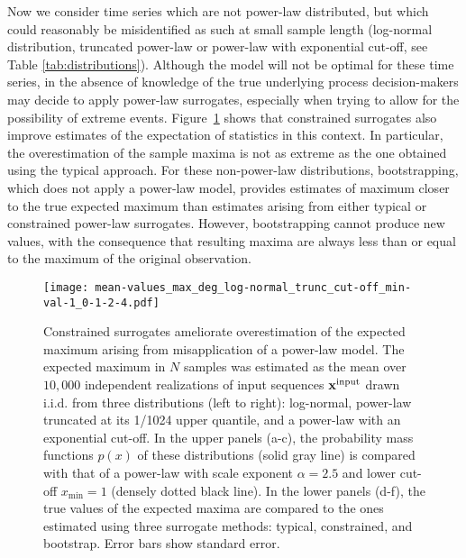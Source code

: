\documentclass[%
prx,
reprint,
superscriptaddress,
nofootinbib,
 amsmath,amssymb,
 aps,
floatfix,
]{revtex4-2}
\newcommand{\xin}{{{\bf x}^{\text{input}}}}
\begin{document}
Now we consider time series which are not power-law distributed, but which could reasonably be misidentified as such at small sample length (log-normal distribution, truncated power-law or power-law with exponential cut-off, see Table \ref{tab:distributions}). 
Although the model will not be optimal for these time series, in the absence of knowledge of the true underlying process decision-makers may decide to apply power-law surrogates, especially when trying to allow for the possibility of extreme events. Figure~\ref{fig:max_other_data} shows that constrained surrogates also improve estimates of the expectation of statistics in this context. In particular, the overestimation of the sample maxima is not as extreme as the one obtained using the typical approach. For these non-power-law distributions, bootstrapping, which does not apply a power-law model, provides estimates of maximum closer to the true expected maximum than estimates arising from either typical or constrained power-law surrogates. However, bootstrapping cannot produce new values, with the consequence that resulting maxima are always less than or equal to the maximum of the original observation.

\begin{figure}[htbp]
\texttt{[image: mean-values\_max\_deg\_log-normal\_trunc\_cut-off\_min-val-1\_0-1-2-4.pdf]}
\caption{
Constrained surrogates ameliorate overestimation of the expected maximum arising from misapplication of a power-law model. The expected maximum in $N$ samples was estimated as the mean over $10,000$ independent realizations of input sequences $\xin$ drawn i.i.d. from three distributions (left to right): log-normal, power-law truncated at its 1/1024 upper quantile, and a power-law with an exponential cut-off. In the upper panels (a-c), the probability mass functions $p(x)$ of these distributions (solid gray line) is compared with that of a power-law with scale exponent $\alpha = 2.5$ and lower cut-off $x_{\min} = 1$ (densely dotted black line). In the lower panels (d-f), the true values of the expected maxima are compared to the ones estimated using three surrogate methods: typical, constrained, and  bootstrap. Error bars show standard error.
}
\label{fig:max_other_data}
\end{figure}
\end{document}
